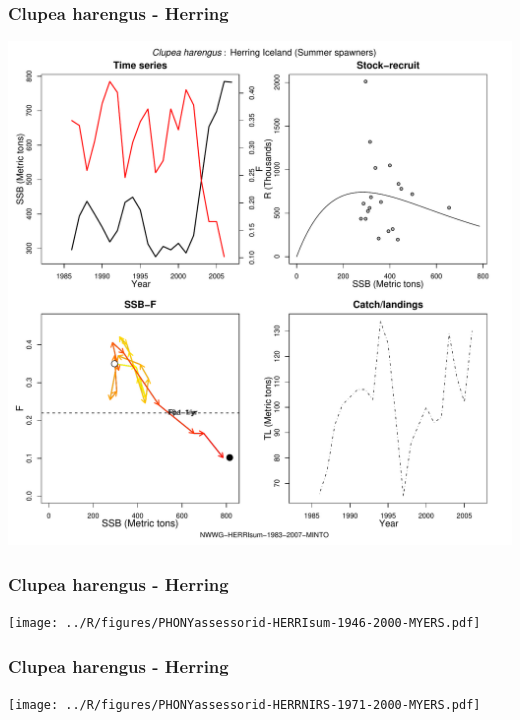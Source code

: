 \subsubsection{Clupea harengus - Herring}
\begin{center}
\includegraphics[width=1.2\textwidth]{../R/figures/NWWG-HERRIsum-1983-2007-MINTO.pdf}
\end{center}

\subsubsection{Clupea harengus - Herring}
\begin{center}
\texttt{[image: ../R/figures/PHONYassessorid-HERRIsum-1946-2000-MYERS.pdf]}
\end{center}

\subsubsection{Clupea harengus - Herring}
\begin{center}
\texttt{[image: ../R/figures/PHONYassessorid-HERRNIRS-1971-2000-MYERS.pdf]}
\end{center}

